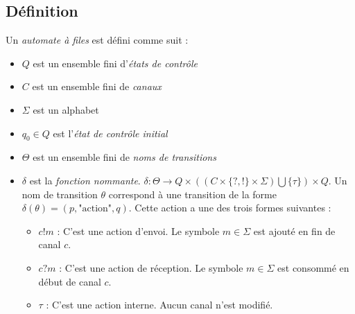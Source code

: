 
\subsection{Définition}\label{fifo:def}
\begin{definition}
  Un \emph{automate à files} \fifo est défini comme suit :
  \begin{itemize}
    \item $Q$ est un ensemble fini d'\emph{états de contrôle}
    \item $C$ est un ensemble fini de \emph{canaux}
    \item $\Sigma$ est un alphabet
    \item $q_0 \in Q$ est l'\emph{état de contrôle initial}
    \item $\Theta$ est un ensemble fini de \emph{noms de transitions}
    \item $\delta$ est la \emph{fonction nommante}. $\delta : \Theta \rightarrow Q \times ((C \times \{?,!\} \times \Sigma) \bigcup \{\tau\}) \times Q$. Un nom de transition $\theta$ correspond à une transition de la forme $\delta(\theta)=(p,\text{"action"},q)$. Cette action a une des trois formes suivantes :
    \begin{itemize}
      \item $c!m$ : C'est une action d'envoi. Le symbole $m\in\Sigma$ est ajouté en fin de canal $c$.
      \item $c?m$ : C'est une action de réception. Le symbole $m\in\Sigma$ est consommé en début de canal $c$.
      \item $\tau$ : C'est une action interne. Aucun canal n'est modifié.
    \end{itemize}
  \end{itemize}
\end{definition}




